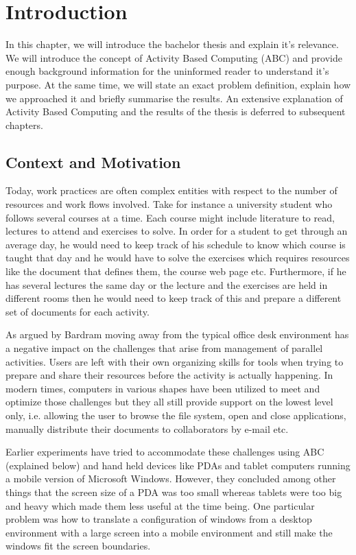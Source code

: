 \chapter{Introduction}
In this chapter, we will introduce the bachelor thesis and explain it's relevance. We will introduce the concept of Activity Based Computing (ABC) and provide enough background information for the uninformed reader to understand it's purpose. At the same time, we will state an exact problem definition, explain how we approached it and briefly summarise the results. An extensive explanation of Activity Based Computing and the results of the thesis is deferred to subsequent chapters.

\section{Context and Motivation}
Today, work practices are often complex entities with respect to the number of resources and work flows involved. Take for instance a university student who follows several courses at a time. Each course might include literature to read, lectures to attend and exercises to solve. In order for a student to get through an average day, he would need to keep track of his schedule to know which course is taught that day and he would have to solve the exercises which requires resources like the document that defines them, the course web page etc. Furthermore, if he has several lectures the same day or the lecture and the exercises are held in different rooms then he would need to keep track of this and prepare a different set of documents for each activity.

As argued by Bardram \citep{bardram2011} moving away from the typical office desk environment has a negative impact on the challenges that arise from management of parallel activities. Users are left with their own organizing skills for tools when trying to prepare and share their resources before the activity is actually happening. In modern times, computers in various shapes have been utilized to meet and optimize those challenges but they all still provide support on the lowest level only, i.e. allowing the user to browse the file system, open and close applications, manually distribute their documents to collaborators by e-mail etc. 

Earlier experiments have tried to accommodate these challenges using ABC (explained below) and hand held devices like PDAs and tablet computers \citep{bardram2009} running a mobile version of Microsoft Windows. However, they concluded among other things that the screen size of a PDA was too small whereas tablets were too big and heavy which made them less useful at the time being. One particular problem was how to translate a configuration of windows from a desktop environment with a large screen into a mobile environment and still make the windows fit the screen boundaries. 

